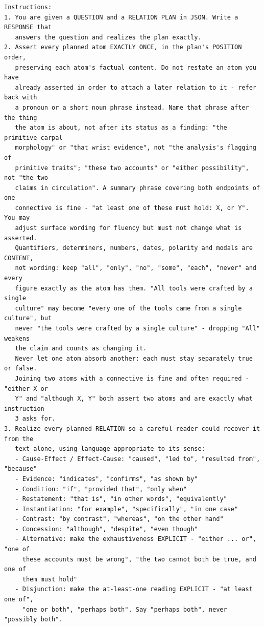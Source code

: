 \documentclass[11pt]{article}
\begin{document}
\begin{small}
\begin{verbatim}
Instructions:
1. You are given a QUESTION and a RELATION PLAN in JSON. Write a RESPONSE that
   answers the question and realizes the plan exactly.
2. Assert every planned atom EXACTLY ONCE, in the plan's POSITION order,
   preserving each atom's factual content. Do not restate an atom you have
   already asserted in order to attach a later relation to it - refer back with
   a pronoun or a short noun phrase instead. Name that phrase after the thing
   the atom is about, not after its status as a finding: "the primitive carpal
   morphology" or "that wrist evidence", not "the analysis's flagging of
   primitive traits"; "these two accounts" or "either possibility", not "the two
   claims in circulation". A summary phrase covering both endpoints of one
   connective is fine - "at least one of these must hold: X, or Y". You may
   adjust surface wording for fluency but must not change what is asserted.
   Quantifiers, determiners, numbers, dates, polarity and modals are CONTENT,
   not wording: keep "all", "only", "no", "some", "each", "never" and every
   figure exactly as the atom has them. "All tools were crafted by a single
   culture" may become "every one of the tools came from a single culture", but
   never "the tools were crafted by a single culture" - dropping "All" weakens
   the claim and counts as changing it.
   Never let one atom absorb another: each must stay separately true or false.
   Joining two atoms with a connective is fine and often required - "either X or
   Y" and "although X, Y" both assert two atoms and are exactly what instruction
   3 asks for.
3. Realize every planned RELATION so a careful reader could recover it from the
   text alone, using language appropriate to its sense:
   - Cause-Effect / Effect-Cause: "caused", "led to", "resulted from", "because"
   - Evidence: "indicates", "confirms", "as shown by"
   - Condition: "if", "provided that", "only when"
   - Restatement: "that is", "in other words", "equivalently"
   - Instantiation: "for example", "specifically", "in one case"
   - Contrast: "by contrast", "whereas", "on the other hand"
   - Concession: "although", "despite", "even though"
   - Alternative: make the exhaustiveness EXPLICIT - "either ... or", "one of
     these accounts must be wrong", "the two cannot both be true, and one of
     them must hold"
   - Disjunction: make the at-least-one reading EXPLICIT - "at least one of",
     "one or both", "perhaps both". Say "perhaps both", never "possibly both".

\end{verbatim}
\end{small}
\end{document}
